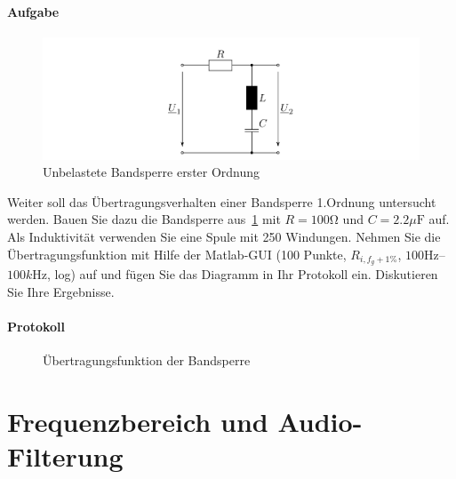 \documentclass[10pt]{scrreprt}
\begin{document}
    \paragraph{Aufgabe}
    \begin{center}
        \begin{figure}[H]
            \includegraphics[width=\textwidth]{abb19.png}
            \caption{Unbelastete Bandsperre erster Ordnung}
            \label{fig:abb19}
        \end{figure}
    \end{center}
    Weiter soll das Übertragungsverhalten einer Bandsperre 1.Ordnung untersucht werden.
    Bauen Sie dazu die Bandsperre aus~\ref{fig:abb19} mit $R = 100 \si{\ohm}$ und $C = 2.2 \si{\mu\farad}$ auf. Als
    Induktivität verwenden Sie eine Spule mit 250 Windungen.
    Nehmen Sie die Übertragungsfunktion mit Hilfe der Matlab-GUI (100 Punkte, $R_{i,f_g+1\%}$,
    $100\si{\hertz}$–$100\si{k\hertz}$, log) auf und fügen Sie das Diagramm in Ihr Protokoll ein. Diskutieren
    Sie Ihre Ergebnisse.
    \paragraph{Protokoll}
    \begin{center}
        \begin{figure}[H]
            \caption{Übertragungsfunktion der Bandsperre}
        \end{figure}
    \end{center}

    \section{Frequenzbereich und Audio-Filterung}
\end{document}
